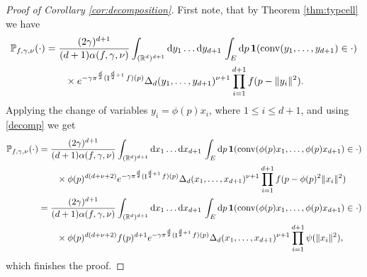 \documentclass[11pt,a4paper]{article}
\theoremstyle{plain}
\theoremstyle{definition}
\theoremstyle{remark}
\def\PP{\mathbb{P}}
\def\RR{\mathbb{R}}
\newcommand{\dd}{{\rm d}}
\newcommand{\conv}{\mathop{\mathrm{conv}}\nolimits}
\newcommand{\frI}{\mathop{\mathrm{I}}\nolimits}
\begin{document}
    \begin{proof}[Proof of Corollary \ref{cor:decomposition}] 
    First note, that by Theorem \ref{thm:typcell} we have
    \begin{align*}
        \PP_{f,\gamma,\nu}(\cdot)&=\frac{(2\gamma)^{d+1}}{(d+1)\alpha(f,\gamma,\nu)} \int_{(\RR^{d})^{d+1}}\dd y_1\dots \dd y_{d+1} \, \int_{E}\dd p\,{\bf 1}(\conv(y_1,\dots,y_{d+1})\in \cdot) \\
        &\qquad\times e^{-\gamma\pi^\frac{d}{2} (\frI^{\frac{d}{2}+1}f)(p)} \Delta_{d}(y_1,\dots,y_{d+1})^{\nu+1}\prod_{i=1}^{d+1}f(p-\|y_i\|^2).
    \end{align*}  
    Applying the change of variables $y_i=\phi(p)x_i$, where $1\leq i\leq d+1$, and using \eqref{decomp} we get
    \begin{align*}
        \PP_{f,\gamma,\nu}(\cdot)&=\frac{(2\gamma)^{d+1}}{(d+1)\alpha(f,\gamma,\nu)} \int_{(\RR^{d})^{d+1}}\dd x_1\dots \dd x_{d+1} \, \int_{E}\dd p\,{\bf 1}(\conv(\phi(p)x_1,\dots,\phi(p)x_{d+1})\in \cdot) \\
        &\qquad\times \phi(p)^{d(d+\nu+2)}e^{-\gamma\pi^\frac{d}{2} (\frI^{\frac{d}{2}+1}f)(p)} \Delta_{d}(x_1,\dots,x_{d+1})^{\nu+1}\prod_{i=1}^{d+1}f(p-\phi(p)^2\|x_i\|^2)\\
        &=\frac{(2\gamma)^{d+1}}{(d+1)\alpha(f,\gamma,\nu)} \int_{(\RR^{d})^{d+1}}\dd x_1\dots \dd x_{d+1} \, \int_{E}\dd p\,{\bf 1}(\conv(\phi(p)x_1,\dots,\phi(p)x_{d+1})\in \cdot) \\
        &\qquad\times \phi(p)^{d(d+\nu+2)}f(p)^{d+1}e^{-\gamma\pi^\frac{d}{2} (\frI^{\frac{d}{2}+1}f)(p)} \Delta_{d}(x_1,\dots,x_{d+1})^{\nu+1}\prod_{i=1}^{d+1}\psi(\|x_i\|^2),
    \end{align*}  
    which finishes the proof.
    \end{proof}
\end{document}

